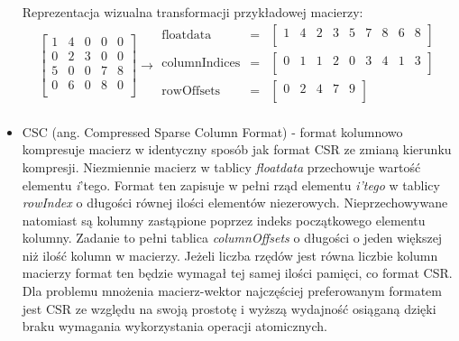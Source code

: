 \begin{itemize}
    Reprezentacja wizualna transformacji przykładowej macierzy:
    \[
\left[
\begin{array}{ccccc}
    1 & 4 & 0 & 0 & 0\\ 
    0 & 2 & 3 & 0 & 0\\ 
    5 & 0 & 0 & 7 & 8\\ 
    0 & 6 & 0 & 8 & 0\\ 
\end{array}
\right]
\rightarrow
\begin{matrix}
\text{floatdata} & = & \begin{bmatrix}
1 & 4 & 2 & 3 & 5 & 7 & 8 & 6 & 8 \\
\end{bmatrix} \\
\text{columnIndices} & = & \begin{bmatrix}
0 & 1 & 1 & 2 & 0 & 3 & 4 & 1 & 3 \\
\end{bmatrix} \\
\text{rowOffsets} & = & \begin{bmatrix}
0 & 2 & 4 & 7 & 9 \\
\end{bmatrix} \\
\end{matrix}
\]

    \item CSC (ang. Compressed Sparse Column Format) - format kolumnowo kompresuje macierz w identyczny sposób jak format CSR ze zmianą kierunku kompresji.
    Niezmiennie macierz w tablicy \textit{floatdata} przechowuje wartość elementu \textit{i}'tego.
    Format ten zapisuje w pełni rząd elementu \textit{i'tego} w tablicy \textit{rowIndex} o długości równej ilości elementów niezerowych.
    Nieprzechowywane natomiast są kolumny zastąpione poprzez indeks początkowego elementu kolumny.
    Zadanie to pełni tablica \textit{columnOffsets} o długości o jeden większej niż ilość kolumn w macierzy.
    Jeżeli liczba rzędów jest równa liczbie kolumn macierzy format ten będzie wymagał tej samej ilości pamięci, co format CSR.
    Dla problemu mnożenia macierz-wektor najczęściej preferowanym formatem jest CSR ze względu na swoją prostotę i wyższą wydajność osiąganą dzięki braku wymagania wykorzystania operacji atomicznych.
    

\end{itemize}
